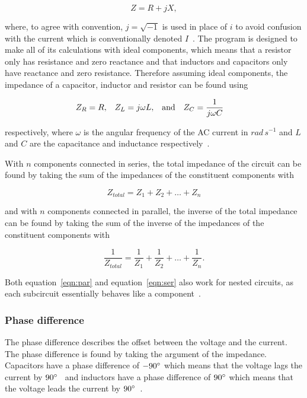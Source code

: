 \begin{equation}
  Z=R+jX ,
\end{equation}

where, to agree with convention, $j = \sqrt{-1}$ is used in place of $i$ to avoid confusion with the current which is conventionally denoted $I$~\cite{ref:omalley}.
The program is designed to make all of its calculations with ideal components, which means that a resistor only has resistance and zero reactance and that inductors and capacitors only have reactance and zero resistance. Therefore assuming ideal components, the impedance of a capacitor, inductor and resistor can be found using

\begin{align}
   Z_{R}&=R,   &   Z_{L}&=j\omega{}L,   & \textnormal{and} & &  Z_{C}&=\frac{1}{j\omega{}C}
\end{align}

respectively, where $\omega$ is the angular frequency of the AC current in $rad\,s^{-1}$ and $L$ and $C$ are the capacitance and inductance respectively~\cite{ref:omalley}.

With $n$ components connected in series, the total impedance of the circuit can be found by taking the sum of the impedances of the constituent components with

\begin{equation}
  \label{eqn:ser}
  Z_{total} = Z_1 + Z_2 + \ldots + Z_n
\end{equation}

and with $n$ components connected in parallel, the inverse of the total impedance can be found by taking the sum of the inverse of the impedances of the constituent components with

\begin{equation}
  \label{eqn:par}
  \frac{1}{Z_{total}} = \frac{1}{Z_1} + \frac{1}{Z_2} + \ldots + \frac{1}{Z_n}.
\end{equation}

Both equation~\ref{eqn:par} and equation~\ref{eqn:ser} also work for nested circuits, as each subcircuit essentially behaves like a component~\cite{ref:omalley}.

\subsubsection*{Phase difference}
The phase difference describes the offset between the voltage and the current. The phase difference is found by taking the argument of the impedance. Capacitors have a phase difference of $-90\degree$ which means that the voltage lags the current by $90\degree$~\cite{ref:cap} and inductors have a phase difference of $90\degree$ which means that the voltage leads the current by $90\degree$~\cite{ref:ind}.
